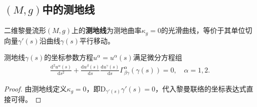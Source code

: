 \documentclass[../../main.tex]{subfiles}%
\begin{document}
\subsection{$(M,g)$中的测地线}

\begin{definition}
二维黎曼流形$(M,g)$上的\textbf{测地线}为测地曲率$\kappa_g=0$的光滑曲线，等价于其单位切向量$\gamma'(s)$沿曲线$\gamma(s)$平行移动。
\end{definition}

\begin{proposition}
测地线$\gamma(s)$的坐标参数方程$u^\alpha=u^\alpha(s)$满足微分方程组
\begin{align}
\frac{\mathrm{d}^2u^\alpha(s)}{\mathrm{d}s^2}+\frac{\mathrm{d}u^\beta(s)}{\mathrm{d}s}\frac{\mathrm{d}u^\gamma(s)}{\mathrm{d}s}\Gamma^\alpha_{\beta\gamma}(\gamma(s))=0,\quad \alpha=1,2.\label{eq:geo_eq}
\end{align}
\end{proposition}
\begin{proof}
由测地线定义$\kappa_g=0$，即$\mathrm{D}_{\gamma'(s)}\gamma'(s)=0$，代入黎曼联络的坐标表达式直接可得。
\end{proof}
\end{document}
